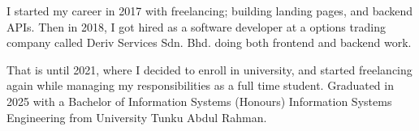

\begin{cvparagraph}

I started my career in 2017 with freelancing; building landing pages, and backend APIs. Then in 2018, I got hired as a software developer at a options trading company called Deriv Services Sdn. Bhd. doing both frontend and backend work. 

That is until 2021, where I decided to enroll in university, and started freelancing again while managing my responsibilities as a full time student. Graduated in 2025 with a Bachelor of Information Systems (Honours) Information Systems Engineering from University Tunku Abdul Rahman.

\end{cvparagraph}

